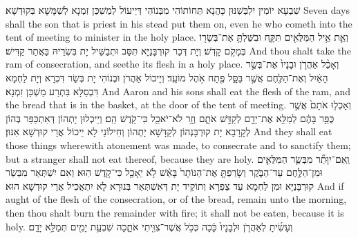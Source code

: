 {שִׁבְעָא יוֹמִין יִלְבְּשִׁנּוּן כָּהֲנָא תְּחוֹתוֹהִי מִבְּנוֹהִי דְּיֵיעוֹל לְמַשְׁכַּן זִמְנָא לְשַׁמָּשָׁא בְּקוּדְשָׁא׃}
{Seven days shall the son that is priest in his stead put them on, even he who cometh into the tent of meeting to minister in the holy place.}{}
{וְאֵ֛ת אֵ֥יל הַמִּלֻּאִ֖ים תִּקָּ֑ח וּבִשַּׁלְתָּ֥ אֶת־בְּשָׂר֖וֹ בְּמָקֹ֥ם קָדֹֽשׁ׃
}
{וְיָת דְּכַר קוּרְבָּנַיָּא תִּסַּב וּתְבַשֵּׁיל יָת בִּשְׂרֵיהּ בַּאֲתַר קַדִּישׁ׃}
{And thou shalt take the ram of consecration, and seethe its flesh in a holy place.}{}
{וְאָכַ֨ל אַהֲרֹ֤ן וּבָנָיו֙ אֶת־בְּשַׂ֣ר הָאַ֔יִל וְאֶת־הַלֶּ֖חֶם אֲשֶׁ֣ר בַּסָּ֑ל פֶּ֖תַח אֹ֥הֶל מוֹעֵֽד׃
}
{וְיֵיכוֹל אַהֲרֹן וּבְנוֹהִי יָת בְּשַׂר דִּכְרָא וְיָת לַחְמָא דִּבְסַלָּא בִּתְרַע מַשְׁכַּן זִמְנָא׃}
{And Aaron and his sons shall eat the flesh of the ram, and the bread that is in the basket, at the door of the tent of meeting.}{}
{וְאָכְל֤וּ אֹתָם֙ אֲשֶׁ֣ר כֻּפַּ֣ר בָּהֶ֔ם לְמַלֵּ֥א אֶת־יָדָ֖ם לְקַדֵּ֣שׁ אֹתָ֑ם וְזָ֥ר לֹא־יֹאכַ֖ל כִּי־קֹ֥דֶשׁ הֵֽם׃
}
{וְיֵיכְלוּן יָתְהוֹן דְּאִתְכַּפַּר בְּהוֹן לְקָרָבָא יָת קוּרְבָּנְהוֹן לְקַדָּשָׁא יָתְהוֹן וְחִילוֹנַי לָא יֵיכוֹל אֲרֵי קוּדְשָׁא אִנּוּן׃}
{And they shall eat those things wherewith atonement was made, to consecrate and to sanctify them; but a stranger shall not eat thereof, because they are holy.}{}
{וְֽאִם־יִוָּתֵ֞ר מִבְּשַׂ֧ר הַמִּלֻּאִ֛ים וּמִן־הַלֶּ֖חֶם עַד־הַבֹּ֑קֶר וְשָׂרַפְתָּ֤ אֶת־הַנּוֹתָר֙ בָּאֵ֔שׁ לֹ֥א יֵאָכֵ֖ל כִּי־קֹ֥דֶשׁ הֽוּא׃}
{וְאִם יִשְׁתְּאַר מִבְּשַׂר קוּרְבָּנַיָּא וּמִן לַחְמָא עַד צַפְרָא וְתוֹקֵיד יָת דְּאִשְׁתְּאַר בְּנוּרָא לָא יִתְאֲכִיל אֲרֵי קוּדְשָׁא הוּא׃}
{And if aught of the flesh of the consecration, or of the bread, remain unto the morning, then thou shalt burn the remainder with fire; it shall not be eaten, because it is holy.}{}
{וְעָשִׂ֜יתָ לְאַהֲרֹ֤ן וּלְבָנָיו֙ כָּ֔כָה כְּכֹ֥ל אֲשֶׁר־צִוִּ֖יתִי אֹתָ֑כָה שִׁבְעַ֥ת יָמִ֖ים תְּמַלֵּ֥א יָדָֽם׃
}

